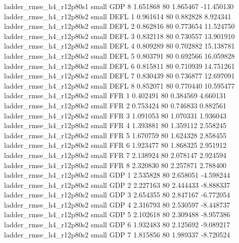  ladder_rmse_h4_r12p80s1      small      GDP                 8 1.651868 80       1.865467         -11.450130
 ladder_rmse_h4_r12p80s2      small     DEFL                 1 0.961614 80       0.882828           8.924341
 ladder_rmse_h4_r12p80s2      small     DEFL                 2 0.862816 80       0.773654          11.524750
 ladder_rmse_h4_r12p80s2      small     DEFL                 3 0.832118 80       0.730557          13.901910
 ladder_rmse_h4_r12p80s2      small     DEFL                 4 0.809289 80       0.702882          15.138781
 ladder_rmse_h4_r12p80s2      small     DEFL                 5 0.803791 80       0.692566          16.059828
 ladder_rmse_h4_r12p80s2      small     DEFL                 6 0.815811 80       0.710939          14.751261
 ladder_rmse_h4_r12p80s2      small     DEFL                 7 0.830439 80       0.736877          12.697091
 ladder_rmse_h4_r12p80s2      small     DEFL                 8 0.852071 80       0.770440          10.595477
 ladder_rmse_h4_r12p80s2      small      FFR                 1 0.402491 80       0.384569           4.660131
 ladder_rmse_h4_r12p80s2      small      FFR                 2 0.753424 80       0.746833           0.882561
 ladder_rmse_h4_r12p80s2      small      FFR                 3 1.091053 80       1.070331           1.936043
 ladder_rmse_h4_r12p80s2      small      FFR                 4 1.393881 80       1.359112           2.558245
 ladder_rmse_h4_r12p80s2      small      FFR                 5 1.670759 80       1.624328           2.858455
 ladder_rmse_h4_r12p80s2      small      FFR                 6 1.923477 80       1.868325           2.951912
 ladder_rmse_h4_r12p80s2      small      FFR                 7 2.138924 80       2.078147           2.924594
 ladder_rmse_h4_r12p80s2      small      FFR                 8 2.320830 80       2.257871           2.788400
 ladder_rmse_h4_r12p80s2      small      GDP                 1 2.535828 80       2.658051          -4.598244
 ladder_rmse_h4_r12p80s2      small      GDP                 2 2.227163 80       2.444433          -8.888337
 ladder_rmse_h4_r12p80s2      small      GDP                 3 2.654355 80       2.847167          -6.772054
 ladder_rmse_h4_r12p80s2      small      GDP                 4 2.316793 80       2.530597          -8.448737
 ladder_rmse_h4_r12p80s2      small      GDP                 5 2.102618 80       2.309488          -8.957386
 ladder_rmse_h4_r12p80s2      small      GDP                 6 1.932483 80       2.125692          -9.089217
 ladder_rmse_h4_r12p80s2      small      GDP                 7 1.815856 80       1.989337          -8.720524
